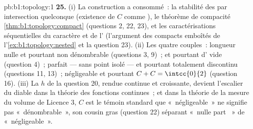 \begin{solution}{pb:b1:topology:1}
\textbf{25.} (i) La construction a consommé~: la stabilité des 
par intersection quelconque (existence de $C$ comme ), le
théorème de compacité \cref{thm:b1:topology:compact} (questions 2,
22, 23), et les caractérisations séquentielles du caractère  et
de l' (l'argument des compacts emboîtés de
l'\cref{ex:b1:topology:nested} et la question 23). (ii) Les quatre
couples~: longueur nulle et pourtant non dénombrable (questions 3,
9)~;  et pourtant d' vide (question 4)~; parfait ---
sans point isolé --- et pourtant totalement discontinu (questions 11,
13)~; négligeable et pourtant $C + C = \intcc{0}{2}$ (question 16).
(iii) La  $h$ de la question 20, rendue continue et
croissante, devient l'escalier du diable dans la théorie des
fonctions continues~; et dans la théorie de la mesure du volume de
Licence 3, $C$ est le témoin standard que «~négligeable~» ne signifie
pas «~dénombrable~», son cousin gras (question 22) séparant «~nulle
part ~» de «~négligeable~».
\end{solution}

